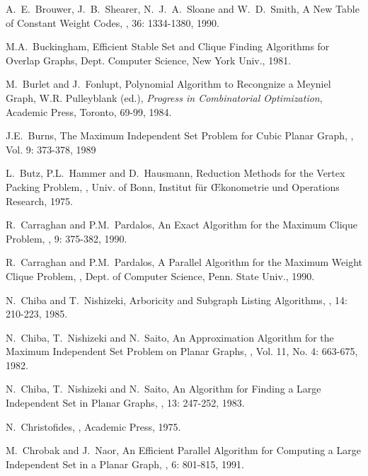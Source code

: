 \begin{thebibliography}{10}
A.~E.~Brouwer, J.~B.~Shearer, N.~J.~A.~Sloane and W.~D.~Smith,
\newblock A New Table of Constant Weight Codes,
, 36: 1334-1380,
1990.

M.A.~Buckingham,
\newblock Efficient Stable Set and Clique Finding Algorithms for
Overlap Graphs,
 Dept. Computer Science, New York
Univ., 1981.

M.~Burlet and J.~Fonlupt,
\newblock Polynomial Algorithm to Recongnize a Meyniel Graph,
\newblock W.R. Pulleyblank (ed.), {\em Progress in Combinatorial
Optimization}, Academic Press, Toronto, 69-99, 1984.

J.E.~Burns,
\newblock The Maximum Independent Set Problem for Cubic Planar Graph,
, Vol. 9: 373-378, 1989

L.~Butz, P.L.~Hammer and D.~Hausmann,
\newblock Reduction Methods for the Vertex Packing Problem,
, Univ. of Bonn, Institut
f\"{u}r \OE konometrie und Operations Research, 1975.

R.~Carraghan and P.M.~Pardalos,
\newblock An Exact Algorithm for the Maximum Clique Problem,
, 9: 375-382, 1990.

R.~Carraghan and P.M.~Pardalos,
\newblock A Parallel Algorithm for the Maximum Weight Clique Problem,
, Dept. of Computer
Science, Penn. State Univ., 1990.

N.~Chiba and T.~Nishizeki,
\newblock Arboricity and Subgraph Listing Algorithms,
, 14: 210-223, 1985.

N.~Chiba, T.~Nishizeki and N.~Saito,
\newblock An Approximation Algorithm for the Maximum Independent Set
Problem on Planar Graphs,
, Vol. 11, No. 4: 663-675, 1982.

N.~Chiba, T.~Nishizeki and N.~Saito,
\newblock An Algorithm for Finding a Large Independent Set in Planar
Graphs,
, 13: 247-252, 1983.

N.~Christofides,
,
\newblock Academic Press, 1975.

M.~Chrobak and J.~Naor,
\newblock An Efficient Parallel Algorithm for Computing a Large
Independent Set in a Planar Graph,
, 6: 801-815, 1991.


\end{thebibliography}
